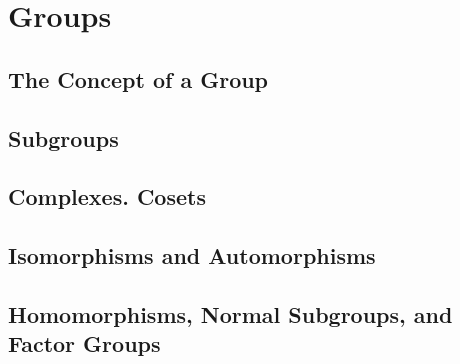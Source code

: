 \section{Groups}

\subsection{The Concept of a Group}

\subsection{Subgroups}

\subsection{Complexes. Cosets}

\subsection{Isomorphisms and Automorphisms}

\subsection{Homomorphisms, Normal Subgroups, and Factor Groups}
